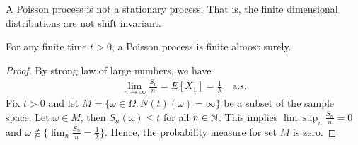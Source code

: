 \documentclass[a4paper,10pt,english]{article}
\begin{document}
\begin{rem} A Poisson process is not a stationary process. That is, the finite dimensional distributions are not shift invariant. 
\end{rem}
\begin{lem} For any finite time $t > 0$, a Poisson process is finite almost surely.
\end{lem}
\begin{proof} By strong law of large numbers, we have 
\begin{align*}
\lim_{n \to \infty} \frac{S_{n}}{n} = E[X_{1}] = \frac{1}{\lambda}\quad\mathrm{a.s.} 
\end{align*}
Fix $t > 0$ and let $M = \{\omega \in \Omega: N(t)(\omega) = \infty \}$ be a subset of the sample space. Let $\omega \in M$, then $S_{n}(\omega)\leqslant t$ for all $n \in \mathbb{N}$. This implies $\lim\sup_n\frac{S_{n}}{n} = 0$  and $\omega \not\in \{\lim_n \frac{S_{n}}{n} = \frac{1}{\lambda} \}.$ Hence, the probability measure for set $M$ is zero. 
\end{proof}
\end{document}
